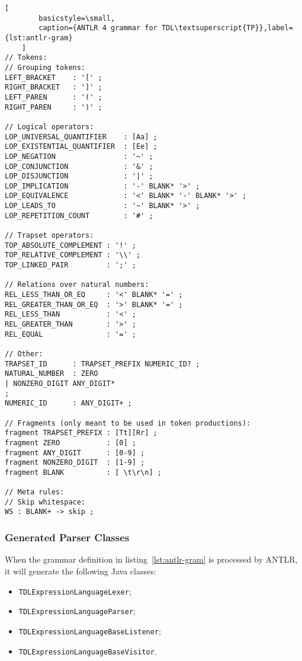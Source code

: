 \documentclass[12pt,oneside,a4paper,notitlepage]{report}
\begin{document}
\begin{lstlisting}[
		basicstyle=\small,
		caption={ANTLR 4 grammar for TDL\textsuperscript{TP}},label={lst:antlr-gram}
	]
// Tokens:
// Grouping tokens:
LEFT_BRACKET    : '[' ;
RIGHT_BRACKET   : ']' ;
LEFT_PAREN      : '(' ;
RIGHT_PAREN     : ')' ;

// Logical operators:
LOP_UNIVERSAL_QUANTIFIER    : [Aa] ;
LOP_EXISTENTIAL_QUANTIFIER  : [Ee] ;
LOP_NEGATION                : '~' ;
LOP_CONJUNCTION             : '&' ;
LOP_DISJUNCTION             : '|' ;
LOP_IMPLICATION             : '-' BLANK* '>' ;
LOP_EQUIVALENCE             : '<' BLANK* '-' BLANK* '>' ;
LOP_LEADS_TO                : '~' BLANK* '>' ;
LOP_REPETITION_COUNT        : '#' ;

// Trapset operators:
TOP_ABSOLUTE_COMPLEMENT : '!' ;
TOP_RELATIVE_COMPLEMENT : '\\' ;
TOP_LINKED_PAIR         : ';' ;

// Relations over natural numbers:
REL_LESS_THAN_OR_EQ     : '<' BLANK* '=' ;
REL_GREATER_THAN_OR_EQ  : '>' BLANK* '=' ;
REL_LESS_THAN           : '<' ;
REL_GREATER_THAN        : '>' ;
REL_EQUAL               : '=' ;

// Other:
TRAPSET_ID      : TRAPSET_PREFIX NUMERIC_ID? ;
NATURAL_NUMBER  : ZERO
| NONZERO_DIGIT ANY_DIGIT*
;
NUMERIC_ID      : ANY_DIGIT+ ;

// Fragments (only meant to be used in token productions):
fragment TRAPSET_PREFIX : [Tt][Rr] ;
fragment ZERO           : [0] ;
fragment ANY_DIGIT      : [0-9] ;
fragment NONZERO_DIGIT  : [1-9] ;
fragment BLANK          : [ \t\r\n] ;

// Meta rules:
// Skip whitespace:
WS : BLANK+ -> skip ;
	\end{lstlisting}

	\newpage

	\subsubsection*{Generated Parser Classes}
	\par When the grammar definition in listing~\ref{lst:antlr-gram} is processed by ANTLR, it will generate the following Java classes:
	\begin{itemize}
		\item \texttt{TDLExpressionLanguageLexer};
		\item \texttt{TDLExpressionLanguageParser};
		\item \texttt{TDLExpressionLanguageBaseListener};
		\item \texttt{TDLExpressionLanguageBaseVisitor}.
	\end{itemize}
\end{document}
